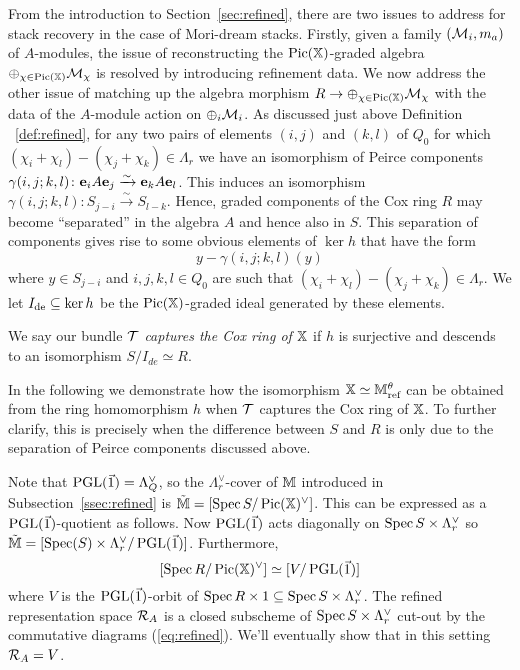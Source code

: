 \documentclass[12pt]{amsart}
\begin{document}
From the introduction to Section~\ref{sec:refined}, there are two issues to address for stack recovery in the case of Mori-dream stacks. Firstly, given a family $(\mathcal{M}_i, m_a)$ of $A$-modules, the issue of reconstructing the $\operatorname{Pic}(\mathbb{X})$-graded algebra $\oplus_{\chi \in \operatorname{Pic}(\mathbb{X})} \mathcal{M}_{\chi}$ is resolved by introducing refinement data. We now address the other issue of matching up the algebra morphism $R \to \oplus_{\chi \in \operatorname{Pic}(\mathbb{X})} \mathcal{M}_{\chi}$ with the data of the $A$-module action on $\oplus_i \mathcal{M}_i$. As discussed just above Definition ~\ref{def:refined}, for any two pairs of elements $(i,j)$ and $(k,l)$ of $Q_0$ for which $(\chi_i + \chi_l)-(\chi_j + \chi_k) \in \Lambda_r$ we have an isomorphism of Peirce components $\gamma(i,j;k,l) \colon \mathbf{e}_i A \mathbf{e}_j \xrightarrow{\sim} \mathbf{e}_k A \mathbf{e}_l$. 
This induces an isomorphism $\gamma(i,j;k,l) \colon S_{j-i} \xrightarrow{\sim} S_{l-k}$.
Hence, graded components of the Cox ring $R$ may become ``separated'' in the algebra $A$ and hence also in $S$. This separation of components gives rise to some obvious elements of $\ker h$ that have the form 
\begin{equation}  \label{eq:deindex}
    y - \gamma(i,j;k,l) (y)
\end{equation}
where $y \in S_{j-i}$ and $i,j,k,l \in Q_0$ are such that $(\chi_i + \chi_l)-(\chi_j + \chi_k) \in \Lambda_r$. We let $I_{\textup{de}}\subseteq \ker h$ be the $\operatorname{Pic}(\mathbb{X})$-graded ideal generated by these elements.

\begin{definition} \label{def:captureCox}
We say our bundle $\mathcal{T}$ {\em captures the Cox ring of $\mathbb{X}$} if $h$ is surjective and descends to an isomorphism $S/I_{de} \simeq R$.
\end{definition}

In the following we demonstrate how the isomorphism $\mathbb{X} \simeq \mathbb{M}_{\text{ref}}^\theta$ can be obtained from the ring homomorphism $h$ when $\mathcal{T}$ captures the Cox ring of $\mathbb{X}$.
To further clarify, this is precisely when the difference between $S$ and $R$ is only due to the separation of Peirce components discussed above.

Note that $\operatorname{PGL}(\vec{1}) = \Lambda_Q^\vee$, so the $\Lambda_r^{\vee}$-cover of $\mathbb{M}$ introduced in Subsection~\ref{ssec:refined} is $\tilde{\mathbb{M}} = [\operatorname{Spec} S/ \operatorname{Pic}(\mathbb{X})^{\vee}]$. This can be expressed as a $\operatorname{PGL}(\vec{1})$-quotient as follows. Now $\operatorname{PGL}(\vec{1})$ acts diagonally on $\operatorname{Spec} S \times \Lambda_r^\vee$ so $\tilde{\mathbb{M}} = [\operatorname{Spec} (S) \times \Lambda_r^{\vee} / \operatorname{PGL}(\vec{1})]$. Furthermore, 
$$[\operatorname{Spec} R/\operatorname{Pic}(\mathbb{X})^\vee] \simeq [V/\operatorname{PGL}(\vec{1})]$$ where $V$ is the $\operatorname{PGL}(\vec{1})$-orbit of $\operatorname{Spec} R \times 1 \subseteq \operatorname{Spec} S \times \Lambda_r^\vee$.
The refined representation space $\mathcal{R}_A$ is a closed subscheme of $\operatorname{Spec} S \times \Lambda_r^\vee$ cut-out by the commutative diagrams (\ref{eq:refined}).
We'll eventually show that in this setting $\mathcal{R}_A = V$.
\end{document}
